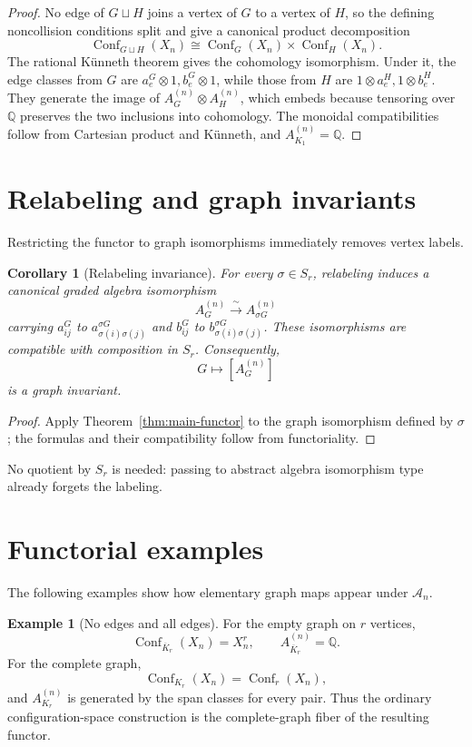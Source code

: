 \documentclass[11pt]{amsart}
\theoremstyle{plain}
\newtheorem{corollary}[theorem]{Corollary}
\theoremstyle{definition}
\newtheorem{example}[theorem]{Example}
\theoremstyle{remark}
\newcommand{\Q}{\mathbb{Q}}
\newcommand{\Conf}{\operatorname{Conf}}
\begin{document}
\begin{proof}
No edge of $G\sqcup H$ joins a vertex of $G$ to a vertex of $H$, so the
defining noncollision conditions split and give a canonical product
decomposition
\[
  \Conf_{G\sqcup H}(X_n)
  \cong \Conf_G(X_n)\times\Conf_H(X_n).
\]
The rational K\"unneth theorem gives the cohomology isomorphism.  Under it,
the edge classes from $G$ are $a_e^G\otimes1,b_e^G\otimes1$, while those from
$H$ are $1\otimes a_e^H,1\otimes b_e^H$.  They generate the image of
$A_G^{(n)}\otimes A_H^{(n)}$, which embeds because tensoring over $\Q$
preserves the two inclusions into cohomology.  The monoidal compatibilities
follow from Cartesian product and K\"unneth, and $A_{K_1}^{(n)}=\Q$.
\end{proof}

\section{Relabeling and graph invariants}

Restricting the functor to graph isomorphisms immediately removes vertex
labels.
\begin{corollary}[Relabeling invariance]\label{cor:relabeling-invariance}
For every $\sigma\in S_r$, relabeling induces a canonical graded algebra
isomorphism
\[
  A_G^{(n)}\xrightarrow{\ \sim\ }A_{\sigma G}^{(n)}
\]
carrying $a_{ij}^G$ to $a_{\sigma(i)\sigma(j)}^{\sigma G}$ and $b_{ij}^G$ to
$b_{\sigma(i)\sigma(j)}^{\sigma G}$.  These isomorphisms are compatible with
composition in $S_r$.  Consequently,
\[
  G\longmapsto [A_G^{(n)}]
\]
is a graph invariant.
\end{corollary}

\begin{proof}
Apply Theorem~\ref{thm:main-functor} to the graph isomorphism defined by
$\sigma$; the formulas and their compatibility follow from functoriality.
\end{proof}

No quotient by $S_r$ is needed: passing to abstract algebra isomorphism type
already forgets the labeling.

\section{Functorial examples}

The following examples show how elementary graph maps appear under
$\mathcal A_n$.

\begin{example}[No edges and all edges]
For the empty graph on $r$ vertices,
\[
  \Conf_{\overline K_r}(X_n)=X_n^r,
  \qquad A_{\overline K_r}^{(n)}=\Q.
\]
For the complete graph,
\[
  \Conf_{K_r}(X_n)=\Conf_r(X_n),
\]
and $A_{K_r}^{(n)}$ is generated by the span classes for every pair.  Thus the
ordinary configuration-space construction is the complete-graph fiber of the
resulting functor.
\end{example}
\end{document}
